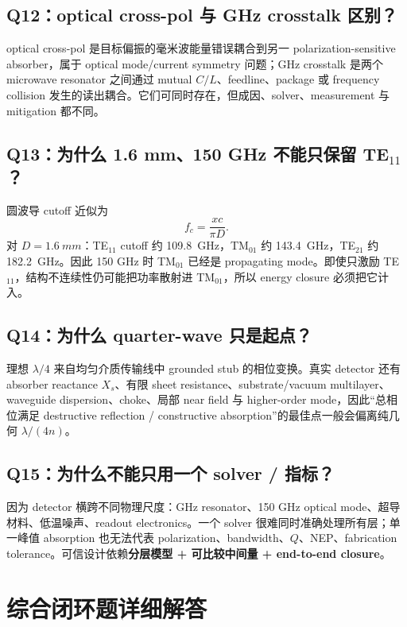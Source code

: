 \documentclass[11pt,a4paper,openany]{ctexrep}
\begin{document}
\subsection*{Q12：optical cross-pol 与 GHz crosstalk 区别？}

optical cross-pol 是目标偏振的毫米波能量错误耦合到另一 polarization-sensitive absorber，属于 optical mode/current symmetry 问题；GHz crosstalk 是两个 microwave resonator 之间通过 mutual $C/L$、feedline、package 或 frequency collision 发生的读出耦合。它们可同时存在，但成因、solver、measurement 与 mitigation 都不同。

\subsection*{Q13：为什么 1.6 mm、150 GHz 不能只保留 TE$_{11}$？}

圆波导 cutoff 近似为
\[
f_c=\frac{x c}{\pi D}.
\]
对 $D=\SI{1.6}{mm}$：TE$_{11}$ cutoff 约 \SI{109.8}{GHz}，TM$_{01}$ 约 \SI{143.4}{GHz}，TE$_{21}$ 约 \SI{182.2}{GHz}。因此 150 GHz 时 TM$_{01}$ 已经是 propagating mode。即使只激励 TE$_{11}$，结构不连续性仍可能把功率散射进 TM$_{01}$，所以 energy closure 必须把它计入。

\subsection*{Q14：为什么 quarter-wave 只是起点？}

理想 $\lambda/4$ 来自均匀介质传输线中 grounded stub 的相位变换。真实 detector 还有 absorber reactance $X_s$、有限 sheet resistance、substrate/vacuum multilayer、waveguide dispersion、choke、局部 near field 与 higher-order mode，因此“总相位满足 destructive reflection / constructive absorption”的最佳点一般会偏离纯几何 $\lambda/(4n)$。

\subsection*{Q15：为什么不能只用一个 solver / 指标？}

因为 detector 横跨不同物理尺度：GHz resonator、150 GHz optical mode、超导材料、低温噪声、readout electronics。一个 solver 很难同时准确处理所有层；单一峰值 absorption 也无法代表 polarization、bandwidth、$Q$、NEP、fabrication tolerance。可信设计依赖\textbf{分层模型 + 可比较中间量 + end-to-end closure}。

\section{综合闭环题详细解答}
\end{document}
